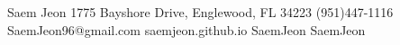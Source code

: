 \header
  {Saem Jeon}
  {1775 Bayshore Drive, Englewood, FL 34223}
  {(951)447-1116}
  {SaemJeon96@gmail.com}
  {saemjeon.github.io}
  {SaemJeon}
  {SaemJeon}